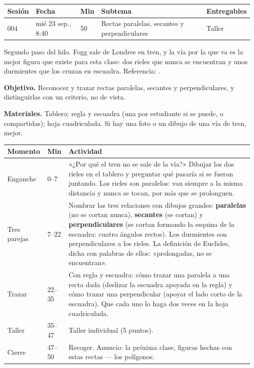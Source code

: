 \documentclass[11pt]{article}
\begin{document}
\encabezado*

\begin{center}
{\renewcommand{\arraystretch}{1.3}
\begin{tabularx}{\linewidth}{@{}l l l X l@{}}
  \toprule
  \textbf{Sesión} & \textbf{Fecha} & \textbf{Min} & \textbf{Subtema} & \textbf{Entregables}\\
  \midrule
  004 & mié 23 sep., 8:40 & 50 & Rectas paralelas, secantes y perpendiculares & Taller\\
  \bottomrule
\end{tabularx}}
\end{center}

Segundo paso del hilo. Fogg sale de Londres en tren, y la vía por la que va es la mejor figura
que existe para esta clase: dos rieles que nunca se encuentran y unos durmientes que los cruzan
en escuadra. Referencia: .


\textbf{Objetivo.} Reconocer y trazar rectas paralelas, secantes y perpendiculares, y
distinguirlas con un criterio, no de vista.

\textbf{Materiales.} Tablero; regla y escuadra (una por estudiante si se puede, o compartidas);
hoja cuadriculada. Si hay una foto o un dibujo de una vía de tren, mejor.

\begin{center}
{\renewcommand{\arraystretch}{1.3}
\begin{tabularx}{\linewidth}{@{}l l X@{}}
  \toprule
  \textbf{Momento} & \textbf{Min} & \textbf{Actividad}\\
  \midrule
  Enganche & 0--7 & «¿Por qué el tren no se sale de la vía?» Dibujar los dos rieles en el
    tablero y preguntar qué pasaría si se fueran juntando. Los rieles son paralelos: van
    siempre a la misma distancia y nunca se tocan, por más que se prolonguen.\\
  Tres parejas & 7--22 & Nombrar las tres relaciones con dibujos grandes: \textbf{paralelas}
    (no se cortan nunca), \textbf{secantes} (se cortan) y \textbf{perpendiculares} (se cortan
    formando la esquina de la escuadra: cuatro ángulos rectos). Los durmientes son
    perpendiculares a los rieles. La definición de Euclides, dicha con palabras de ellos:
    «prolongadas, no se encuentran».\\
  Trazar & 22--35 & Con regla y escuadra: cómo trazar una paralela a una recta dada (deslizar
    la escuadra apoyada en la regla) y cómo trazar una perpendicular (apoyar el lado corto de
    la escuadra). Que cada uno lo haga dos veces en la hoja cuadriculada.\\
  Taller & 35--47 & Taller individual (5 puntos).\\
  Cierre & 47--50 & Recoger. Anuncio: la próxima clase, figuras hechas con estas rectas —
    los polígonos.\\
  \bottomrule
\end{tabularx}}
\end{center}
\end{document}
